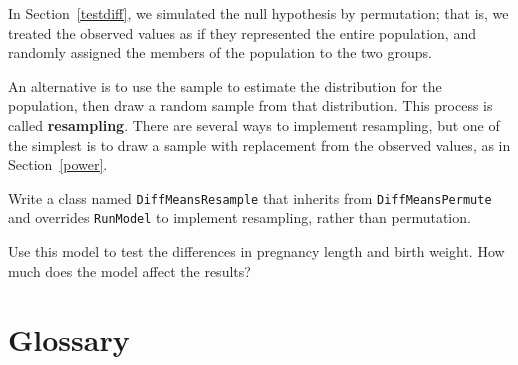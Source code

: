 \documentclass[12pt]{book}
\begin{document}
\begin{exercise}

In Section~\ref{testdiff}, we simulated the null hypothesis by
permutation; that is, we treated the observed values as if they
represented the entire population, and randomly assigned the
members of the population to the two groups.

An alternative is to use the sample to estimate the distribution for
the population, then draw a random sample from that distribution.
This process is called {\bf resampling}.  There are several ways to
implement resampling, but one of the simplest is to draw a sample
with replacement from the observed values, as in Section~\ref{power}.

Write a class named \verb"DiffMeansResample" that inherits from
\verb"DiffMeansPermute" and overrides \verb"RunModel" to implement
resampling, rather than permutation.

Use this model to test the differences in pregnancy length and
birth weight.  How much does the model affect the results?

\end{exercise}


\section{Glossary}
\end{document}
